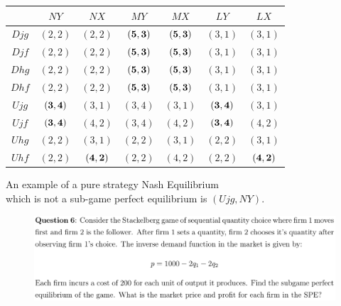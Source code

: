 \documentclass[12pt]{article}
\newenvironment{solution}[2][Solution]{\begin{trivlist}
\item[\hskip \labelsep {\bfseries #1}]}{\end{trivlist}}
\begin{document}
\begin{solution}{}
\begin{enumerate}[label=(\alph*)]
\begin{center}
\begin{tabular}{| c || c | c | c | c | c | c |}\hline
& $NY$ & $NX$ & $MY$ & $MX$ & $LY$ & $LX$ \\ \hline\hline
$Djg$ & $(2,2)$ & $(2,2)$ & \cellcolor{blue!25}$\bold{(5,3)}$ & \cellcolor{blue!25}$\bold{(5,3)}$ & $(3,1)$ & $(3,1)$ \\ \hline
$Djf$ & $(2,2)$ & $(2,2)$ & \cellcolor{blue!25}$\bold{(5,3)}$ & \cellcolor{blue!25}$\bold{(5,3)}$ & $(3,1)$ & $(3,1)$ \\ \hline
$Dhg$ & $(2,2)$ & $(2,2)$ & \cellcolor{blue!25}$\bold{(5,3)}$ & \cellcolor{blue!25}$\bold{(5,3)}$ & $(3,1)$ & $(3,1)$ \\ \hline
$Dhf$ & $(2,2)$ & $(2,2)$ & \cellcolor{blue!25}$\bold{(5,3)}$ & \cellcolor{blue!25}$\bold{(5,3)}$ & $(3,1)$ & $(3,1)$ \\ \hline
$Ujg$ & \cellcolor{blue!25}$\bold{(3,4)}$ & $(3,1)$ & $(3,4)$ & $(3,1)$ & \cellcolor{blue!25}$\bold{(3,4)}$ & $(3,1)$ \\ \hline
$Ujf$ & \cellcolor{blue!25}$\bold{(3,4)}$ & $(4,2)$ & $(3,4)$ & $(4,2)$ & \cellcolor{blue!25}$\bold{(3,4)}$ & $(4,2)$ \\ \hline
$Uhg$ & $(2,2)$ & $(3,1)$ & $(2,2)$ & $(3,1)$ & $(2,2)$ & $(3,1)$ \\ \hline
$Uhf$ & $(2,2)$ & \cellcolor{blue!25}$\bold{(4,2)}$ & $(2,2)$ & $(4,2)$ & $(2,2)$ & \cellcolor{blue!25}$\bold{(4,2)}$ \\ \hline
\end{tabular}
\end{center}
\begin{center}
An example of a pure strategy Nash Equilibrium\\
which is not a sub-game perfect equilibrium is $(Ujg,NY)$.
\end{center}
\end{enumerate}
\end{solution}

\begin{figure}[h!]
\includegraphics[width=\linewidth]{./assets/201806021730.png}
\end{figure}
\end{document}
